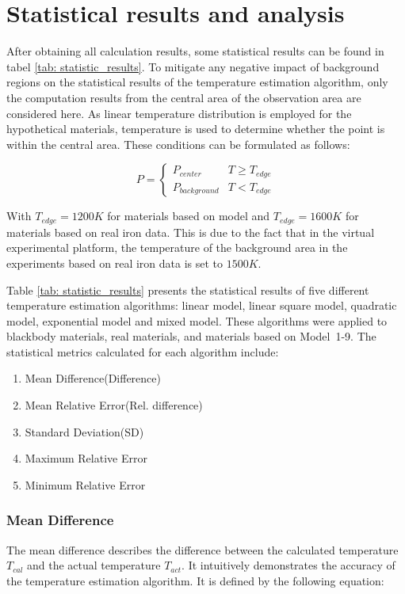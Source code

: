 \section{Statistical results and analysis}

After obtaining all calculation results, some statistical results can be found in 
tabel \ref{tab: statistic_results}. To mitigate any negative impact of background 
regions on the statistical results of the temperature estimation algorithm, 
only the computation results from the central area of the observation 
area are considered here. As linear temperature distribution 
is employed for the hypothetical materials, temperature is used to determine 
whether the point is within 
the central area. These conditions can be formulated as follows:


\begin{equation}
    P = \begin{cases}
        P_{center}  & T \geq T_{edge} \\
        P_{background}  & T < T_{edge}
    \end{cases}
    \label{eq: T_edge}
\end{equation}


With $T_{edge} = 1200K$ for materials based on model and $T_{edge} = 1600K$ for materials based 
on real iron data. This is due to the fact that in the virtual experimental 
platform, the temperature of the background area in the experiments based on 
real iron data is set to $1500K$.


Table \ref{tab: statistic_results} presents the statistical results of five 
different temperature estimation algorithms: linear model, linear square model, 
quadratic model, exponential model and mixed model. These algorithms were 
applied to blackbody materials, real materials, and materials based on \mbox{Model 1-9}. 
The statistical metrics calculated for each algorithm include:


\begin{enumerate}
    \item Mean Difference(Difference)
    \item Mean Relative Error(Rel. difference)
    \item Standard Deviation(SD)
    \item Maximum Relative Error
    \item Minimum Relative Error
\end{enumerate}

\subsubsection{Mean Difference}
The mean difference describes the difference between the calculated 
temperature $T_{cal}$ and the actual temperature $T_{act}$. It intuitively 
demonstrates the accuracy of the temperature estimation algorithm. It is 
defined by the following equation:

